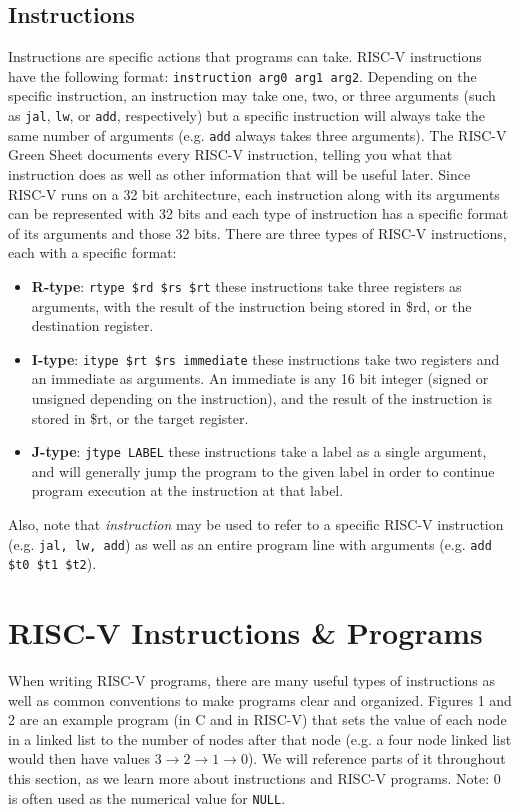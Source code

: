 \documentclass{article}
\begin{document}
\subsection{Instructions}
Instructions are specific actions that programs can take. RISC-V instructions have the following format: \texttt{instruction arg0 arg1 arg2}. Depending on the specific instruction, an instruction may take one, two, or three arguments (such as \texttt{jal},  \texttt{lw}, or \texttt{add}, respectively) but a specific instruction will always take the same number of arguments (e.g.  \texttt{add} always takes three arguments). The RISC-V Green Sheet documents every RISC-V instruction, telling you what that instruction does as well as other information that will be useful later. Since RISC-V runs on a 32 bit architecture, each instruction along with its arguments can be represented with 32 bits and each type of instruction has a specific format of its arguments and those 32 bits. There are three types of RISC-V instructions, each with a specific format:

\begin{itemize}
\item \textbf{R-type}: \texttt{rtype \$rd \$rs \$rt} these instructions take three registers as arguments, with the result of the instruction being stored in \$rd, or the destination register.
\item \textbf{I-type}: \texttt{itype \$rt \$rs immediate} these instructions take two registers and an immediate as arguments. An immediate is any 16 bit integer (signed or unsigned depending on the instruction), and the result of the instruction is stored in \$rt, or the target register.
\item \textbf{J-type}: \texttt{jtype LABEL} these instructions take a label as a single argument, and will generally jump the program to the given label in order to continue program execution at the instruction at that label.
\end{itemize}

Also, note that \textit{instruction} may be used to refer to a specific RISC-V instruction (e.g. \texttt{jal, lw, add}) as well as an entire program line with arguments (e.g. \texttt{add \$t0 \$t1 \$t2}).


\section{RISC-V Instructions \& Programs}
When writing RISC-V programs, there are many useful types of instructions as well as common conventions to make programs clear and organized. Figures 1 and 2 are an example program (in C and in RISC-V) that sets the value of each node in a linked list to the number of nodes after that node (e.g. a four node linked list would then have values $3\rightarrow2\rightarrow1\rightarrow0$). We will reference parts of it throughout this section, as we learn more about instructions and RISC-V programs. Note: $0$ is often used as the numerical value for \texttt{NULL}.
\end{document}
